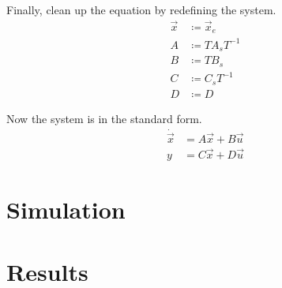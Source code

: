 \documentclass[12pt,onecolumn,reqno]{amsart}
\begin{document}
Finally, clean up the equation by redefining the system.
\begin{align*}
  \vec{x} &\coloneqq \vec{x}_{e}    \\
  A       &\coloneqq T A_{s} T^{-1} \\
  B       &\coloneqq T B_{s}        \\
  C       &\coloneqq C_{s} T^{-1}   \\
  D       &\coloneqq D
\end{align*}

Now the system is in the standard form.
\begin{align}
  \dot{\vec{x}} &= A \vec{x} + B \vec{u} \\
  y &= C \vec{x} + D \vec{u}
\end{align}
\section{Simulation}


\section{Results}




\end{document}
